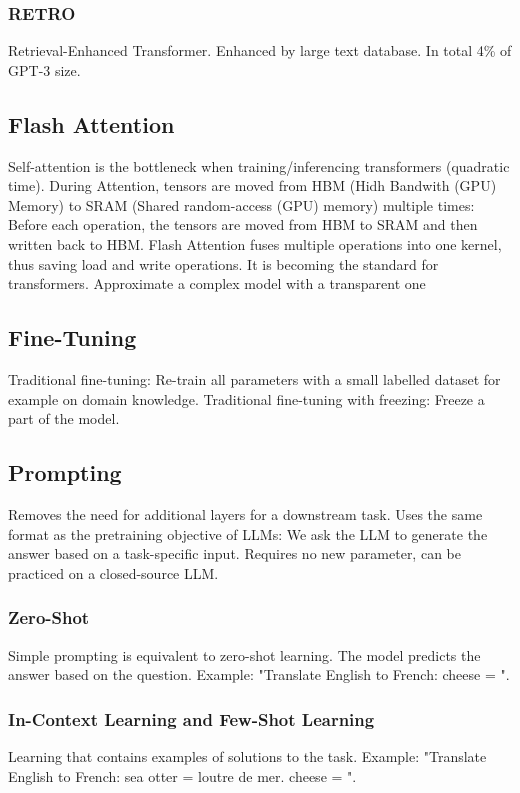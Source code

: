 \documentclass{scrartcl}
\begin{document}
\subsubsection*{RETRO}
Retrieval-Enhanced Transformer.
Enhanced by large text database.
In total 4\% of GPT-3 size.

\subsection*{Flash Attention}
Self-attention is the bottleneck when training/inferencing transformers (quadratic time).
During Attention, tensors are moved from HBM (Hidh Bandwith (GPU) Memory) to SRAM (Shared random-access (GPU) memory) multiple times: Before each operation, the tensors are moved from HBM to SRAM and then written back to HBM.
Flash Attention fuses multiple operations into one kernel, thus saving load and write operations. It is becoming the standard for transformers.
Approximate a complex model with a transparent one
\subsection*{Fine-Tuning}
Traditional fine-tuning: Re-train all parameters with a small labelled dataset for example on domain knowledge.
Traditional fine-tuning with freezing: Freeze a part of the model.

\subsection*{Prompting}
Removes the need for additional layers for a downstream task. Uses the same format as the pretraining objective of LLMs: We ask the LLM to generate the answer based on a task-specific input.
Requires no new parameter, can be practiced on a closed-source LLM.

\subsubsection*{Zero-Shot}
Simple prompting is equivalent to zero-shot learning. The model predicts the answer based on the question.
Example: "Translate English to French: cheese = ".

\subsubsection*{In-Context Learning and Few-Shot Learning}
Learning that contains examples of solutions to the task.
Example: "Translate English to French: sea otter = loutre de mer. cheese = ".
\end{document}
